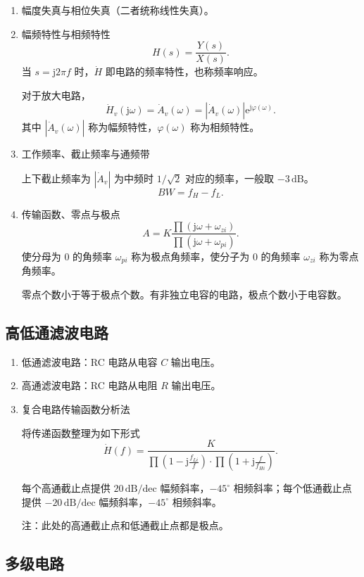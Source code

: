 \documentclass[UTF8,fontset=fandol,zihao=5]{ctexart}
\newcommand{\ee}{\mathrm{e}}
\newcommand{\jj}{\mathrm{j}}
\begin{document}
\begin{enumerate}
  \item 幅度失真与相位失真（二者统称线性失真）。
  \item 幅频特性与相频特性
  \[
    H(s)=\frac{Y(s)}{X(s)}.
  \]
  当 $s=\jj2\pi f$ 时，$\dot H$ 即电路的频率特性，也称频率响应。

  对于放大电路，
  \[
    \dot H_v(\jj\omega)=\dot A_v(\omega)=|\dot A_v(\omega)|\ee^{\jj\varphi(\omega)}.
  \]
  其中 $|\dot A_v(\omega)|$ 称为幅频特性，$\varphi(\omega)$ 称为相频特性。

  \item 工作频率、截止频率与通频带

  上下截止频率为 $|\dot A_v|$ 为中频时 $1/\sqrt2$ 对应的频率，一般取 $-3\,\mathrm{dB}$。
  \[
    BW=f_H-f_L.
  \]

  \item 传输函数、零点与极点
  \[
    A=K\frac{\prod(\jj\omega+\omega_{zi})}{\prod(\jj\omega+\omega_{pi})}.
  \]
  使分母为 0 的角频率 $\omega_{pi}$ 称为极点角频率，使分子为 0 的角频率 $\omega_{zi}$ 称为零点角频率。

  零点个数小于等于极点个数。有非独立电容的电路，极点个数小于电容数。
\end{enumerate}

\subsection{高低通滤波电路}

\begin{enumerate}
  \item 低通滤波电路：RC 电路从电容 $C$ 输出电压。
  \item 高通滤波电路：RC 电路从电阻 $R$ 输出电压。
  \item 复合电路传输函数分析法

  将传递函数整理为如下形式
  \[
    \dot H(f)=\frac{K}{\displaystyle\prod\left(1-\jj\frac{f_{Li}}f\right)
    \cdot\prod\left(1+\jj\frac f{f_{Hi}}\right)}.
  \]

  每个高通截止点提供 $20\,\mathrm{dB/dec}$ 幅频斜率，$-45^\circ$ 相频斜率；每个低通截止点提供 $-20\,\mathrm{dB/dec}$ 幅频斜率，$-45^\circ$ 相频斜率。

  注：此处的高通截止点和低通截止点都是极点。
\end{enumerate}

\subsection{多级电路}
\end{document}
